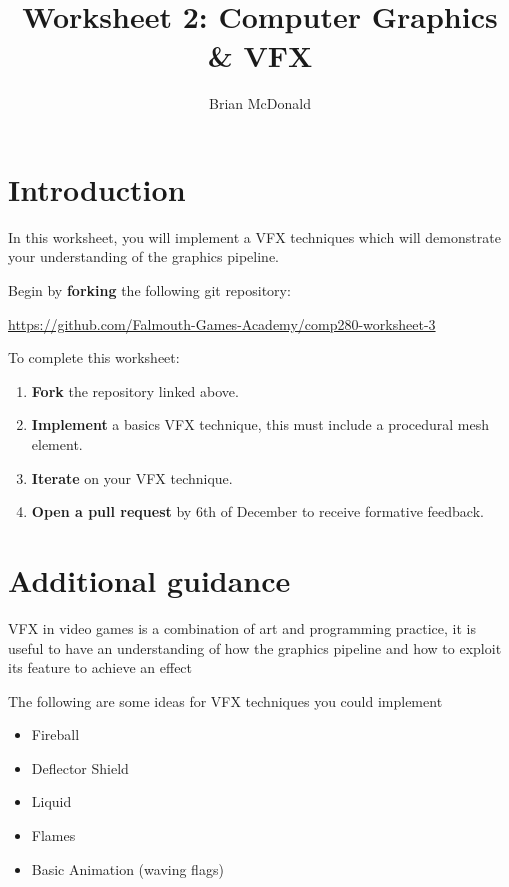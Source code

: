 \documentclass{../../../fal_assignment}
\title{Worksheet 2: Computer Graphics \& VFX}
\author{Brian McDonald}
\begin{document}
\maketitle


\section*{Introduction}

In this worksheet, you will implement a VFX techniques which will demonstrate your understanding of the graphics pipeline.

Begin by \textbf{forking} the following git repository:

\begin{center}
	\url{https://github.com/Falmouth-Games-Academy/comp280-worksheet-3}
\end{center}

To complete this worksheet:

\begin{enumerate}
	\item \textbf{Fork} the repository linked above.
	\item \textbf{Implement} a basics VFX technique, this must include a procedural mesh element.
	\item \textbf{Iterate} on your VFX technique.
	\item \textbf{Open a pull request} by 6th of December to receive formative feedback.
\end{enumerate}

\section*{Additional guidance}

VFX in video games is a combination of art and programming practice, it is useful to have an understanding of how the graphics pipeline and how to exploit its feature to achieve an effect

The following are some ideas for VFX techniques you could implement

\begin{itemize}
	\item Fireball
	\item Deflector Shield 
	\item Liquid
	\item Flames
	\item Basic Animation (waving flags)
\end{itemize}
\end{document}
